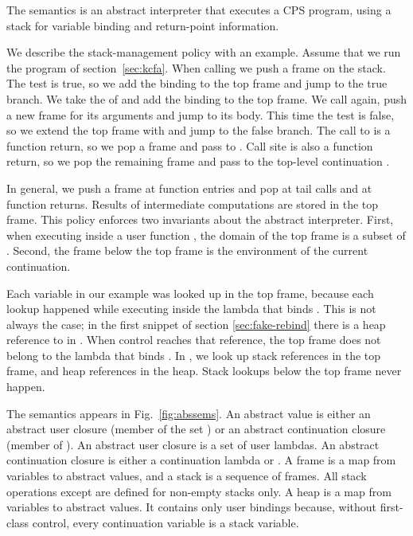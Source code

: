 \documentclass{LMCS}
\theoremstyle{definition} \newtheorem{property}[thm]{Property}
\begin{document}
The \cfat{} semantics is an abstract interpreter that executes a CPS program,
using a stack for variable binding and return-point information.

We describe the stack-management policy with an example.
Assume that we run the  program of section~\ref{sec:kcfa}.
When calling  we push a frame 
 on the stack.
The test   is true, so we add the binding 
 to the top frame and jump to the true branch.
We take the  of  and add the binding 
to the top frame.
We call  again, push a new frame for its arguments and jump to its body.
This time the test is false, so we extend the top frame with
 and jump to the false branch.
The call to  is a function return, so we pop a frame and pass  
to .
Call site  is also a function return, so we pop the remaining 
frame and pass  to the top-level continuation \haltcont.

In general, we push a frame at function entries and pop at tail calls and at
function returns.
Results of intermediate computations are stored in the top frame.
This policy enforces two invariants about the abstract interpreter.
First, when executing inside a user function \pulam, the domain of the top frame
is a subset of .
Second, the frame below the top frame is the environment of the current
continuation.

Each variable  in our example was looked up in the top frame,
because each lookup happened while executing inside the lambda that binds .
This is not always the case; in the first snippet of section
\ref{sec:fake-rebind} there is a heap reference to  in .
When control reaches that reference, the top frame does not belong to the
lambda that binds .
In \cfat, we look up stack references in the top frame, and heap references in 
the heap.
Stack lookups below the top frame never happen.

The \cfat{} semantics appears in Fig.~\ref{fig:abssems}.
An abstract value is either an abstract user closure (member of the 
set \dauclos) or an abstract continuation closure (member of \dacclos).
An abstract user closure is a set of user lambdas.
An abstract continuation closure is either a continuation lambda or \haltcont.
A frame is a map from variables to abstract values, 
and a stack is a sequence of frames.
All stack operations except \pushNA{} are defined for non-empty stacks only.
A heap is a map from variables to abstract values.
It contains only user bindings because, without first-class control, every 
continuation variable is a stack variable.
\end{document}
